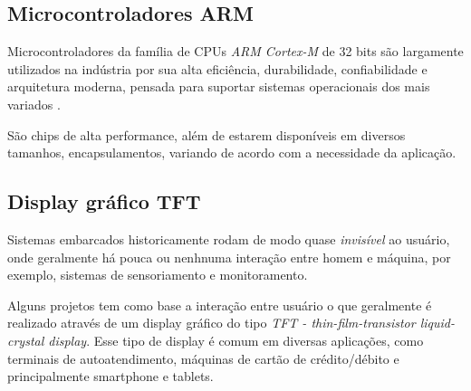 \documentclass[times, twoside, watermark]{artigo}
\begin{document}
\subsection{Microcontroladores ARM}

Microcontroladores da família de CPUs \textit{ARM Cortex-M} de 32 bits são largamente utilizados na indústria por sua alta eficiência, durabilidade, confiabilidade e arquitetura moderna, pensada para suportar sistemas operacionais dos mais variados \cite{masteringstm32}.

São chips de alta performance, além de estarem disponíveis em diversos tamanhos, encapsulamentos, variando de acordo com a necessidade da aplicação.


\subsection{Display gráfico TFT}
Sistemas embarcados historicamente rodam de modo quase \textit{invisível} ao usuário, onde geralmente há pouca ou nenhnuma interação entre homem e máquina, por exemplo, sistemas de sensoriamento e monitoramento.

Alguns projetos tem como base a interação entre usuário o que geralmente é realizado através de um display gráfico do tipo \textit{TFT - thin-film-transistor liquid-crystal display}. Esse tipo de display é comum em diversas aplicações, como terminais de autoatendimento, máquinas de cartão de crédito/débito e principalmente smartphone e tablets.





\end{document}
